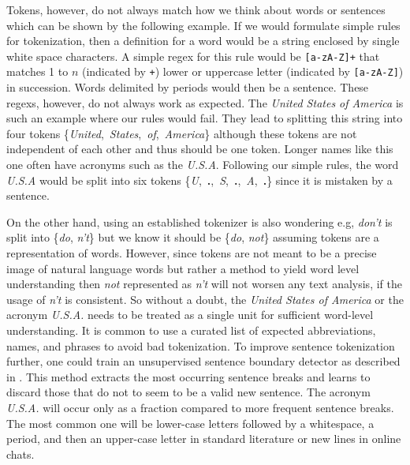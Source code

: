   Tokens, however, do not always match how we think about words or sentences which can be shown by the following example.
  If we would formulate simple rules for tokenization, then a definition for a word would be a string enclosed by single white space characters.
  A simple regex for this rule would be \texttt{[a-zA-Z]+} that matches 1 to $n$ (indicated by \texttt{+}) lower or uppercase letter (indicated by \texttt{[a-zA-Z]}) in succession.
  Words delimited by periods would then be a sentence.
  These regexs, however, do not always work as expected.
  The \textit{United States of America} is such an example where our rules would fail.
  They lead to splitting this string into four tokens \mbox{\{\textquotesingle \textit{United}\textquotesingle, \textquotesingle \textit{States}\textquotesingle, \textquotesingle \textit{of}\textquotesingle, \textquotesingle \textit{America}\textquotesingle\}} although these tokens are not independent of each other and thus should be one token.
  Longer names like this one often have acronyms such as the \textit{U.S.A}.
  Following our simple rules, the word \textit{U.S.A} would be split into six tokens \mbox{\{\textquotesingle \textit{U}\textquotesingle, \textquotesingle \textbf{.}\textquotesingle, \textquotesingle \textit{S}\textquotesingle, \textquotesingle \textbf{.}\textquotesingle, \textquotesingle \textit{A}\textquotesingle, \textquotesingle \textbf{.}\textquotesingle\}} since it is mistaken by a sentence.

  On the other hand, using an established tokenizer is also wondering e.g, \textit{don't} is split into \{\textquotesingle \textit{do}\textquotesingle, \textquotesingle \textit{n't}\textquotesingle\} but we know it should be \{\textquotesingle \textit{do}\textquotesingle, \textquotesingle \textit{not}\textquotesingle\} assuming tokens are a representation of words.
  However, since tokens are not meant to be a precise image of natural language words but rather a method to yield word level understanding then \textit{not} represented as \textit{n't} will not worsen any text analysis, if the usage of \textit{n't} is consistent.
  So without a doubt, the \textit{United States of America} or the acronym \textit{U.S.A.} needs to be treated as a single unit for sufficient word-level understanding.
  It is common to use a curated list of expected abbreviations, names, and phrases to avoid bad tokenization.
  To improve sentence tokenization further, one could train an unsupervised sentence boundary detector as described in \cite{Kiss2006}.
  This method extracts the most occurring sentence breaks and learns to discard those that do not to seem to be a valid new sentence.
  The acronym \textit{U.S.A.} will occur only as a fraction compared to more frequent sentence breaks.
  The most common one will be lower-case letters followed by a whitespace, a period, and then an upper-case letter in standard literature or new lines in online chats.

